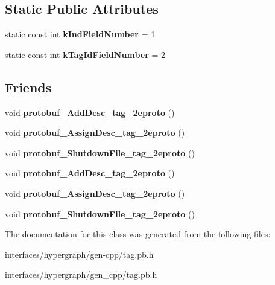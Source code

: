 \subsection*{Static Public Attributes}
\begin{DoxyCompactItemize}
\item 
\hypertarget{classTagging_acd90c8d2f16535b6a8810a911a047274}{
static const int {\bfseries kIndFieldNumber} = 1}
\label{classTagging_acd90c8d2f16535b6a8810a911a047274}

\item 
\hypertarget{classTagging_aee9291b65c5317b5d58c9dfab2d0af6d}{
static const int {\bfseries kTagIdFieldNumber} = 2}
\label{classTagging_aee9291b65c5317b5d58c9dfab2d0af6d}

\end{DoxyCompactItemize}
\subsection*{Friends}
\begin{DoxyCompactItemize}
\item 
\hypertarget{classTagging_a5b6e1d0ac3f12cf6b846b7bc86f7fc96}{
void {\bfseries protobuf\_\-AddDesc\_\-tag\_\-2eproto} ()}
\label{classTagging_a5b6e1d0ac3f12cf6b846b7bc86f7fc96}

\item 
\hypertarget{classTagging_a84116f221ec83265dfdeb3bb01f9bd6c}{
void {\bfseries protobuf\_\-AssignDesc\_\-tag\_\-2eproto} ()}
\label{classTagging_a84116f221ec83265dfdeb3bb01f9bd6c}

\item 
\hypertarget{classTagging_a955ed450e7afd4065ffef15152e72563}{
void {\bfseries protobuf\_\-ShutdownFile\_\-tag\_\-2eproto} ()}
\label{classTagging_a955ed450e7afd4065ffef15152e72563}

\item 
\hypertarget{classTagging_a5b6e1d0ac3f12cf6b846b7bc86f7fc96}{
void {\bfseries protobuf\_\-AddDesc\_\-tag\_\-2eproto} ()}
\label{classTagging_a5b6e1d0ac3f12cf6b846b7bc86f7fc96}

\item 
\hypertarget{classTagging_a84116f221ec83265dfdeb3bb01f9bd6c}{
void {\bfseries protobuf\_\-AssignDesc\_\-tag\_\-2eproto} ()}
\label{classTagging_a84116f221ec83265dfdeb3bb01f9bd6c}

\item 
\hypertarget{classTagging_a955ed450e7afd4065ffef15152e72563}{
void {\bfseries protobuf\_\-ShutdownFile\_\-tag\_\-2eproto} ()}
\label{classTagging_a955ed450e7afd4065ffef15152e72563}

\end{DoxyCompactItemize}


The documentation for this class was generated from the following files:\begin{DoxyCompactItemize}
\item 
interfaces/hypergraph/gen-\/cpp/tag.pb.h\item 
interfaces/hypergraph/gen\_\-cpp/tag.pb.h\end{DoxyCompactItemize}
